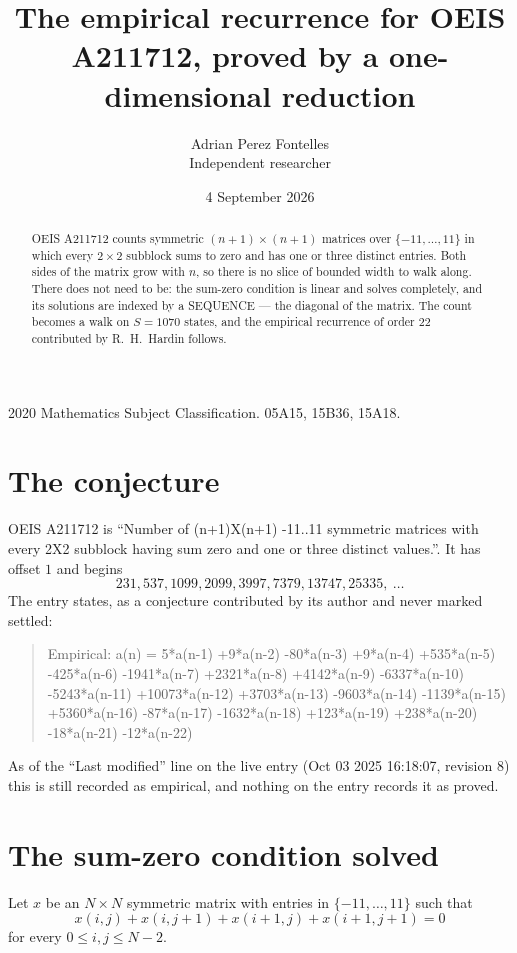 \documentclass[11pt,a4paper]{article}
\title{The empirical recurrence for OEIS A211712, proved by a one-dimensional reduction}
\author{Adrian Perez Fontelles\\ \small Independent researcher}
\date{4 September 2026}
\theoremstyle{plain}
\theoremstyle{definition}
\begin{document}
\maketitle

\begin{abstract}
OEIS A211712 counts symmetric $(n+1)\times(n+1)$ matrices over
$\{-11,\dots,11\}$ in which every $2\times2$ subblock sums to zero and has one or three distinct
entries. Both sides of the matrix grow with $n$, so there is no slice of bounded width to walk
along. There does not need to be: the sum-zero condition is linear and solves completely, and
its solutions are indexed by a SEQUENCE --- the diagonal of the matrix. The count becomes a walk
on $S=1070$ states, and the empirical recurrence of order $22$ contributed by R.~H.~Hardin
follows.
\end{abstract}

\noindent\small 2020 Mathematics Subject Classification. 05A15, 15B36, 15A18.\normalsize

\section{The conjecture}

OEIS A211712 is ``Number of (n+1)X(n+1) -11..11 symmetric matrices with every 2X2 subblock having sum zero and one or three distinct values.''. It has offset $1$ and begins
\[
231, 537, 1099, 2099, 3997, 7379, 13747, 25335,\ \dots
\]
The entry states, as a conjecture contributed by its author and never marked settled:
\begin{quote}
Empirical: a(n) = 5*a(n-1) +9*a(n-2) -80*a(n-3) +9*a(n-4) +535*a(n-5) -425*a(n-6) -1941*a(n-7) +2321*a(n-8) +4142*a(n-9) -6337*a(n-10) -5243*a(n-11) +10073*a(n-12) +3703*a(n-13) -9603*a(n-14) -1139*a(n-15) +5360*a(n-16) -87*a(n-17) -1632*a(n-18) +123*a(n-19) +238*a(n-20) -18*a(n-21) -12*a(n-22)
\end{quote}
As of the ``Last modified'' line on the live entry (Oct 03 2025 16:18:07, revision 8) this is still
recorded as empirical, and nothing on the entry records it as proved.

\section{The sum-zero condition solved}

Let $x$ be an $N\times N$ symmetric matrix with entries in $\{-11,\dots,11\}$ such that
\[
x(i,j)+x(i,j{+}1)+x(i{+}1,j)+x(i{+}1,j{+}1)=0
\]
for every $0\le i,j\le N-2$.
\end{document}
